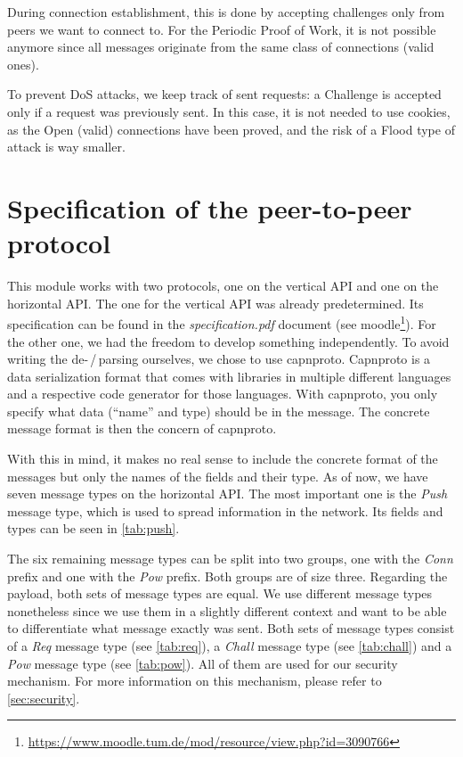 \documentclass[a4paper,english,10pt,NET]{tumarticle}
\begin{document}
During connection establishment, this is done by accepting challenges only from peers we want to connect to. For the Periodic Proof of Work, it is not possible anymore since all messages originate from the same class of connections (valid ones).

To prevent DoS attacks, we keep track of sent requests: a Challenge is accepted only if a request was previously sent. In this case, it is not needed to use cookies, as the Open (valid) connections have been proved, and the risk of a Flood type of attack is way smaller.

\section{Specification of the peer-to-peer protocol} \label{sec:msgtypes}

This module works with two protocols, one on the vertical API and one on the horizontal API.
The one for the vertical API was already predetermined.
Its specification can be found in the \emph{specification.pdf} document (see moodle\footnote{\url{https://www.moodle.tum.de/mod/resource/view.php?id=3090766}}).
For the other one, we had the freedom to develop something independently.
To avoid writing the de-\,/\,parsing ourselves, we chose to use capnproto.
Capnproto is a data serialization format that comes with libraries in multiple different languages and a respective code generator for those languages.
With capnproto, you only specify what data (\enquote{name} and type) should be in the message.
The concrete message format is then the concern of capnproto.

With this in mind, it makes no real sense to include the concrete format of the messages but only the names of the fields and their type.
As of now, we have seven message types on the horizontal API.
The most important one is the \emph{Push} message type, which is used to spread information in the network.
Its fields and types can be seen in \cref{tab:push}.

The six remaining message types can be split into two groups, one with the \emph{Conn} prefix and one with the \emph{Pow} prefix.
Both groups are of size three.
Regarding the payload, both sets of message types are equal.
We use different message types nonetheless since we use them in a slightly different context and want to be able to differentiate what message exactly was sent.
Both sets of message types consist of
a \emph{Req} message type (see \cref{tab:req}),
a \emph{Chall} message type (see \cref{tab:chall}) and
a \emph{Pow} message type (see \cref{tab:pow}).
All of them are used for our security mechanism.
For more information on this mechanism, please refer to \cref{sec:security}.
\end{document}
